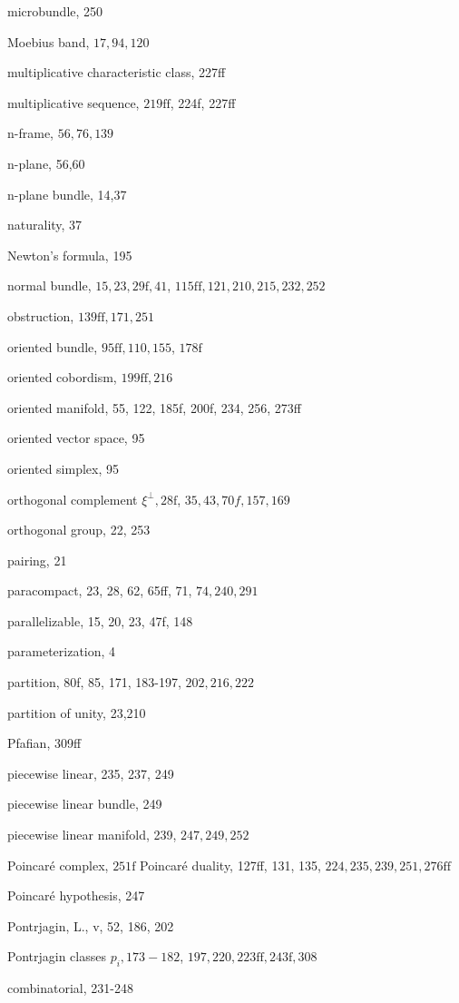 \documentclass[10pt]{article}
\begin{document}
microbundle, 250

Moebius band, $17,94,120$

multiplicative characteristic class, 227ff

multiplicative sequence, $219 \mathrm{ff}$, 224f, 227ff

n-frame, $56,76,139$

n-plane, 56,60

n-plane bundle, 14,37

naturality, 37

Newton's formula, 195

normal bundle, $15,23,29 \mathrm{f}, 41$, $115 \mathrm{ff}, 121,210,215,232,252$

obstruction, $139 \mathrm{ff}, 171,251$

oriented bundle, $95 \mathrm{ff}, 110,155$, $178 \mathrm{f}$

oriented cobordism, $199 \mathrm{ff}, 216$

oriented manifold, 55, 122, 185f, 200f, 234, 256, 273ff

oriented vector space, 95

oriented simplex, 95

orthogonal complement $\xi^{\perp}, 28 \mathrm{f}$, $35,43,70 f, 157,169$

orthogonal group, 22, 253

pairing, 21

paracompact, 23, 28, 62, 65ff, 71, $74,240,291$

parallelizable, 15, 20, 23, 47f, 148

parameterization, 4

partition, 80f, 85, 171, 183-197, $202,216,222$

partition of unity, 23,210

Pfafian, 309ff

piecewise linear, 235, 237, 249

piecewise linear bundle, 249

piecewise linear manifold, 239, $247,249,252$

Poincaré complex, $251 \mathrm{f}$ Poincaré duality, 127ff, 131, 135, $224,235,239,251,276 \mathrm{ff}$

Poincaré hypothesis, 247

Pontrjagin, L., v, 52, 186, 202

Pontrjagin classes $p_{i}, 173-182$, $197,220,223 \mathrm{ff}, 243 \mathrm{f}, 308$

combinatorial, 231-248
\end{document}
